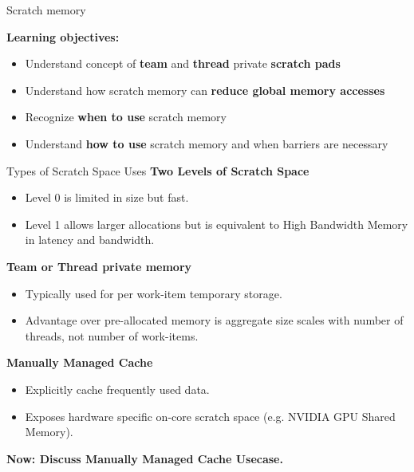 
\begin{frame}[fragile]

  {\Huge Scratch memory}

  \vspace{20pt}

  \textbf{Learning objectives:}
  \begin{itemize}
    \item {Understand concept of \textbf{team} and \textbf{thread} private \textbf{scratch pads}}
    \item {Understand how scratch memory can \textbf{reduce global memory accesses}}
    \item {Recognize \textbf{when to use} scratch memory}
    \item {Understand \textbf{how to use} scratch memory and when barriers are necessary}
  \end{itemize}

  \vspace{-20pt}

\end{frame}


\begin{frame}[fragile]{Types of Scratch Space Uses}
\vspace{-8pt}
\textbf{Two Levels of Scratch Space}
\begin{itemize}
\item{Level 0 is limited in size but fast.}
\item{Level 1 allows larger allocations but is equivalent to High Bandwidth Memory in latency and bandwidth.}
\end{itemize}

\textbf{Team or Thread private memory}
\begin{itemize}
\item{Typically used for per work-item temporary storage.}
\item{Advantage over pre-allocated memory is aggregate size scales with number of threads, not number of work-items.}
\end{itemize}

\textbf{Manually Managed Cache}
\begin{itemize}
\item{Explicitly cache frequently used data.}
\item{Exposes hardware specific on-core scratch space (e.g. NVIDIA GPU Shared Memory).}
\end{itemize}

\pause
\vspace{2pt}
\textbf{Now: Discuss Manually Managed Cache Usecase.}
\end{frame}

